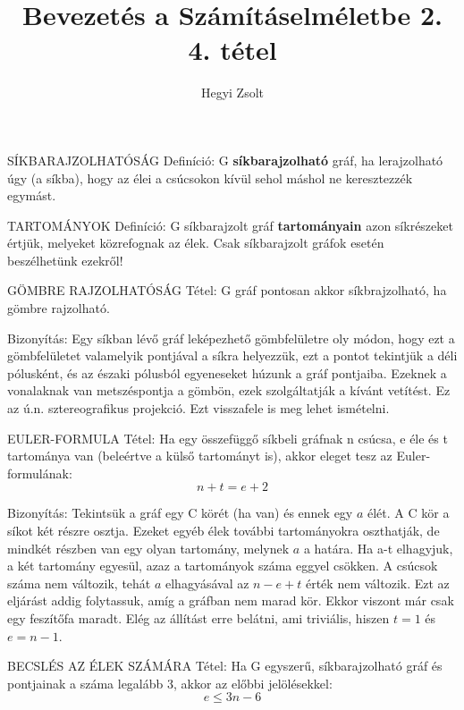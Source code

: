 \documentclass[]{article}
\title{Bevezetés a Számításelméletbe 2.\\{\large 4. tétel}}
\author{Hegyi Zsolt}
\begin{document}
\maketitle
\begin{shaded}
SÍKBARAJZOLHATÓSÁG Definíció: G \textbf{síkbarajzolható} gráf, ha lerajzolható úgy (a síkba), hogy az élei a csúcsokon kívül sehol máshol ne keresztezzék egymást.
\end{shaded}
\begin{shaded}
TARTOMÁNYOK Definíció: G síkbarajzolt gráf \textbf{tartományain} azon síkrészeket értjük, melyeket közrefognak az élek. Csak síkbarajzolt gráfok esetén beszélhetünk ezekről!
\end{shaded}
\begin{framed}
GÖMBRE RAJZOLHATÓSÁG Tétel: G gráf pontosan akkor síkbrajzolható, ha gömbre rajzolható.
\end{framed}
\begin{leftbar}
Bizonyítás: Egy síkban lévő gráf leképezhető gömbfelületre oly módon, hogy ezt a gömbfelületet valamelyik pontjával a síkra helyezzük, ezt a pontot tekintjük a déli pólusként, és az északi pólusból egyeneseket húzunk a gráf pontjaiba. Ezeknek a vonalaknak van metszéspontja a gömbön, ezek szolgáltatják a kívánt vetítést. Ez az ú.n. sztereografikus projekció. Ezt visszafele is meg lehet ismételni.
\end{leftbar}
\begin{framed}
EULER-FORMULA Tétel: Ha egy összefüggő síkbeli gráfnak n csúcsa, e éle és t tartománya van (beleértve a külső tartományt is), akkor eleget tesz az Euler-formulának:
$$n + t = e + 2$$
\end{framed}
\begin{leftbar}
Bizonyítás: Tekintsük a gráf egy C körét (ha van) és ennek egy $a$ élét. A C kör a síkot két részre osztja. Ezeket egyéb élek további tartományokra oszthatják, de mindkét részben van egy olyan tartomány, melynek $a$ a határa. Ha a-t elhagyjuk, a két tartomány egyesül, azaz a tartományok száma eggyel csökken. A csúcsok száma nem változik, tehát $a$ elhagyásával az $n - e + t$ érték nem változik. Ezt az eljárást addig folytassuk, amíg a gráfban nem marad kör. Ekkor viszont már csak egy feszítőfa maradt. Elég az állítást erre belátni, ami triviális, hiszen $t = 1$ és $e = n - 1$.
\end{leftbar}
\begin{framed}
BECSLÉS AZ ÉLEK SZÁMÁRA Tétel: Ha G egyszerű, síkbarajzolható gráf és pontjainak a száma legalább 3, akkor az előbbi jelölésekkel:
$$e \leq 3n - 6$$
\end{framed}
\end{document}
